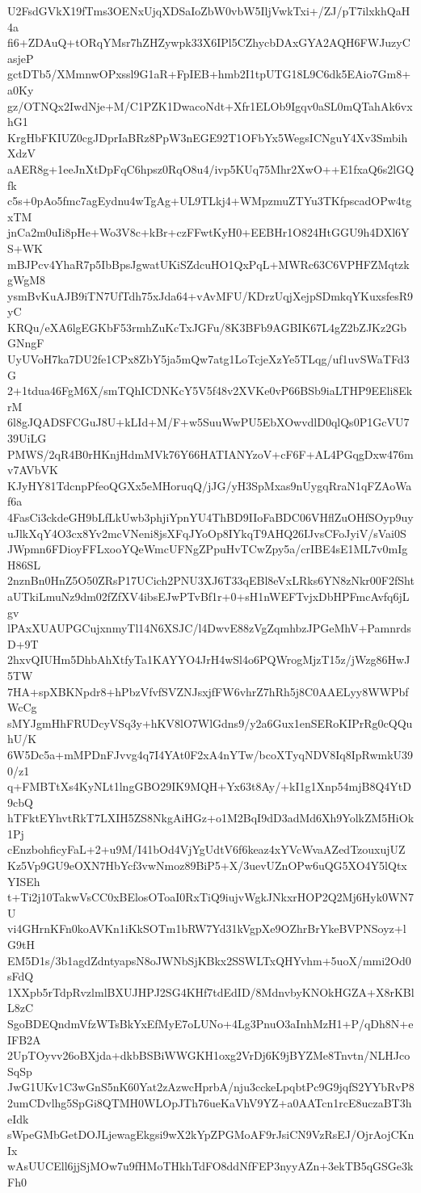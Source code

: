 U2FsdGVkX19fTms3OENxUjqXDSaIoZbW0vbW5IljVwkTxi+/ZJ/pT7ilxkhQaH4a
fi6+ZDAuQ+tORqYMsr7hZHZywpk33X6IPl5CZhycbDAxGYA2AQH6FWJuzyCasjeP
gctDTb5/XMmnwOPxssl9G1aR+FpIEB+hmb2I1tpUTG18L9C6dk5EAio7Gm8+a0Ky
gz/OTNQx2IwdNje+M/C1PZK1DwacoNdt+Xfr1ELOb9Igqv0aSL0mQTahAk6vxhG1
KrgHbFKIUZ0cgJDprIaBRz8PpW3nEGE92T1OFbYx5WegsICNguY4Xv3SmbihXdzV
aAER8g+1eeJnXtDpFqC6hpsz0RqO8u4/ivp5KUq75Mhr2XwO++E1fxaQ6s2lGQfk
c5s+0pAo5fmc7agEydnu4wTgAg+UL9TLkj4+WMpzmuZTYu3TKfpscadOPw4tgxTM
jnCa2m0uIi8pHe+Wo3V8c+kBr+czFFwtKyH0+EEBHr1O824HtGGU9h4DXl6YS+WK
mBJPcv4YhaR7p5IbBpsJgwatUKiSZdcuHO1QxPqL+MWRc63C6VPHFZMqtzkgWgM8
ysmBvKuAJB9iTN7UfTdh75xJda64+vAvMFU/KDrzUqjXejpSDmkqYKuxsfesR9yC
KRQu/eXA6lgEGKbF53rmhZuKcTxJGFu/8K3BFb9AGBIK67L4gZ2bZJKz2GbGNngF
UyUVoH7ka7DU2fe1CPx8ZbY5ja5mQw7atg1LoTcjeXzYe5TLqg/uf1uvSWaTFd3G
2+1tdua46FgM6X/smTQhICDNKcY5V5f48v2XVKe0vP66BSb9iaLTHP9EEli8EkrM
6l8gJQADSFCGuJ8U+kLId+M/F+w5SuuWwPU5EbXOwvdlD0qlQs0P1GcVU739UiLG
PMWS/2qR4B0rHKnjHdmMVk76Y66HATIANYzoV+cF6F+AL4PGqgDxw476mv7AVbVK
KJyHY81TdcnpPfeoQGXx5eMHoruqQ/jJG/yH3SpMxas9nUygqRraN1qFZAoWaf6a
4FasCi3ckdeGH9bLfLkUwb3phjiYpnYU4ThBD9IIoFaBDC06VHflZuOHfSOyp9uy
uJlkXqY4O3cx8Yv2mcVNeni8jsXFqJYoOp8IYkqT9AHQ26IJvsCFoJyiV/sVai0S
JWpmn6FDioyFFLxooYQeWmcUFNgZPpuHvTCwZpy5a/crIBE4sE1ML7v0mIgH86SL
2nznBn0HnZ5O50ZRsP17UCich2PNU3XJ6T33qEBl8eVxLRks6YN8zNkr00F2fSht
aUTkiLmuNz9dm02fZfXV4ibsEJwPTvBf1r+0+sH1nWEFTvjxDbHPFmcAvfq6jLgv
lPAxXUAUPGCujxnmyTl14N6XSJC/l4DwvE88zVgZqmhbzJPGeMhV+PamnrdsD+9T
2hxvQIUHm5DhbAhXtfyTa1KAYYO4JrH4wSl4o6PQWrogMjzT15z/jWzg86HwJ5TW
7HA+spXBKNpdr8+hPbzVfvfSVZNJsxjfFW6vhrZ7hRh5j8C0AAELyy8WWPbfWcCg
sMYJgmHhFRUDcyVSq3y+hKV8lO7WlGdns9/y2a6Gux1enSERoKIPrRg0cQQuhU/K
6W5Dc5a+mMPDnFJvvg4q7I4YAt0F2xA4nYTw/bcoXTyqNDV8Iq8IpRwmkU390/z1
q+FMBTtXs4KyNLt1lngGBO29IK9MQH+Yx63t8Ay/+kI1g1Xnp54mjB8Q4YtD9cbQ
hTFktEYhvtRkT7LXIH5ZS8NkgAiHGz+o1M2BqI9dD3adMd6Xh9YolkZM5HiOk1Pj
cEnzbohficyFaL+2+u9M/I41bOd4VjYgUdtV6f6keaz4xYVcWvaAZedTzouxujUZ
Kz5Vp9GU9eOXN7HbYcf3vwNmoz89BiP5+X/3uevUZnOPw6uQG5XO4Y5lQtxYISEh
t+Ti2j10TakwVsCC0xBElosOToaI0RxTiQ9iujvWgkJNkxrHOP2Q2Mj6Hyk0WN7U
vi4GHrnKFn0koAVKn1iKkSOTm1bRW7Yd31kVgpXe9OZhrBrYkeBVPNSoyz+lG9tH
EM5D1s/3b1agdZdntyapsN8oJWNbSjKBkx2SSWLTxQHYvhm+5uoX/mmi2Od0sFdQ
1XXpb5rTdpRvzlmlBXUJHPJ2SG4KHf7tdEdID/8MdnvbyKNOkHGZA+X8rKBlL8zC
SgoBDEQndmVfzWTsBkYxEfMyE7oLUNo+4Lg3PnuO3aInhMzH1+P/qDh8N+eIFB2A
2UpTOyvv26oBXjda+dkbBSBiWWGKH1oxg2VrDj6K9jBYZMe8Tnvtn/NLHJcoSqSp
JwG1UKv1C3wGnS5nK60Yat2zAzwcHprbA/nju3cckeLpqbtPc9G9jqfS2YYbRvP8
2umCDvlhg5SpGi8QTMH0WLOpJTh76ueKaVhV9YZ+a0AATcn1rcE8uczaBT3heIdk
sWpeGMbGetDOJLjewagEkgsi9wX2kYpZPGMoAF9rJsiCN9VzRsEJ/OjrAojCKnIx
wAsUUCEll6jjSjMOw7u9fHMoTHkhTdFO8ddNfFEP3nyyAZn+3ekTB5qGSGe3kFh0
